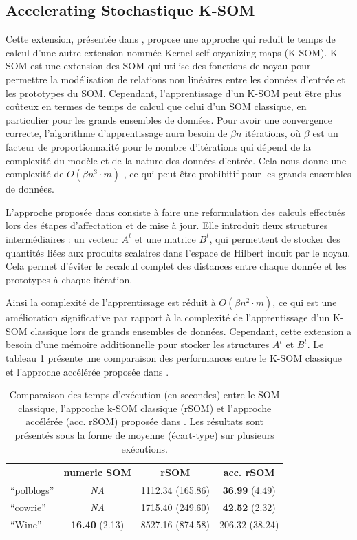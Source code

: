 \documentclass[12pt,a4paper]{report}
\begin{document}
\subsection{Accelerating Stochastique K-SOM}
Cette extension, présentée dans \cite{sto_K_SOM}, propose une approche qui reduit le temps de calcul d'une autre extension nommée Kernel self-organizing maps (K-SOM).
K-SOM est une extension des SOM qui utilise des fonctions de noyau pour permettre la modélisation de relations non linéaires entre les données d'entrée et les prototypes du SOM.
Cependant, l'apprentissage d'un K-SOM peut être plus coûteux en termes de temps de calcul que celui d'un SOM classique, en particulier pour les grands ensembles de données.
Pour avoir une convergence correcte, l'algorithme d'apprentissage aura besoin de $\beta n$ itérations, où $\beta$ est un facteur de proportionnalité pour le nombre d'itérations qui dépend 
de la complexité du modèle et de la nature des données d'entrée. Cela nous donne une complexité de $O(\beta n^3 \cdot m)$ \cite{sto_K_SOM}, ce qui peut être prohibitif pour les grands ensembles de données.

L'approche proposée dans \cite{sto_K_SOM} consiste à faire une reformulation des calculs effectués lors des étapes d'affectation et de mise à jour.
Elle introduit deux structures intermédiaires : un vecteur $A^t$ et une matrice $B^t$, qui permettent de stocker des quantités liées aux produits scalaires dans l'espace de Hilbert induit par le noyau. 
Cela permet d'éviter le recalcul complet des distances entre chaque donnée et les prototypes à chaque itération. 

Ainsi la complexité de l'apprentissage est réduit à $O(\beta n^2 \cdot m)$, ce qui est une amélioration significative par rapport à la complexité de l'apprentissage d'un K-SOM classique lors de grands ensembles de données.
Cependant, cette extension a besoin d'une mémoire additionnelle pour stocker les structures $A^t$ et $B^t$. Le tableau \ref{tab:comparison_ksom} présente une comparaison des performances entre le K-SOM classique et 
l'approche accélérée proposée dans \cite{sto_K_SOM}.

\begin{table}[H]
\centering
\begin{tabular}{l c c c}
\hline
        & numeric SOM     & rSOM              & acc. rSOM        \\
\hline
``polblogs'' & \textit{NA}         & 1112.34 (165.86)   & \textbf{36.99} (4.49) \\
``cowrie''   & \textit{NA}         & 1715.40 (249.60)   & \textbf{42.52} (2.32) \\
``Wine''     & \textbf{16.40} (2.13) & 8527.16 (874.58) & 206.32 (38.24)       \\
\hline
\end{tabular}
\caption{Comparaison des temps d'exécution (en secondes) entre le SOM classique, l'approche k-SOM classique (rSOM) et l'approche accélérée (acc. rSOM) proposée dans \cite{sto_K_SOM}. 
Les résultats sont présentés sous la forme de moyenne (écart-type) sur plusieurs exécutions.}
\label{tab:comparison_ksom}
\end{table}
\end{document}
